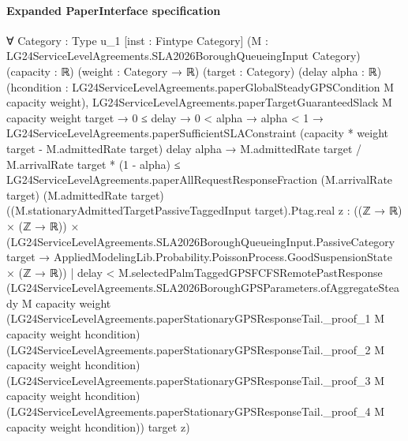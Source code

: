 \documentclass[10pt]{article}
\begin{document}
\paragraph{Expanded PaperInterface specification}
\begin{ReviewVerbatim}
∀ {Category : Type u_1} [inst : Fintype Category] (M : LG24ServiceLevelAgreements.SLA2026BoroughQueueingInput Category)
  (capacity : ℝ) (weight : Category → ℝ) (target : Category) (delay alpha : ℝ)
  (hcondition : LG24ServiceLevelAgreements.paperGlobalSteadyGPSCondition M capacity weight),
  LG24ServiceLevelAgreements.paperTargetGuaranteedSlack M capacity weight target →
    0 ≤ delay →
      0 < alpha →
        alpha < 1 →
          LG24ServiceLevelAgreements.paperSufficientSLAConstraint (capacity * weight target - M.admittedRate target)
              delay alpha →
            M.admittedRate target / M.arrivalRate target * (1 - alpha) ≤
              LG24ServiceLevelAgreements.paperAllRequestResponseFraction (M.arrivalRate target) (M.admittedRate target)
                ((M.stationaryAdmittedTargetPassiveTaggedInput target).Ptag.real
                  {z :
                    ((ℤ → ℝ) × (ℤ → ℝ)) ×
                      (LG24ServiceLevelAgreements.SLA2026BoroughQueueingInput.PassiveCategory target →
                        AppliedModelingLib.Probability.PoissonProcess.GoodSuspensionState × (ℤ → ℝ)) |
                    delay <
                      M.selectedPalmTaggedGPSFCFSRemotePastResponse
                        (LG24ServiceLevelAgreements.SLA2026BoroughGPSParameters.ofAggregateSteady M capacity weight
                          (LG24ServiceLevelAgreements.paperStationaryGPSResponseTail._proof_1 M capacity weight
                            hcondition)
                          (LG24ServiceLevelAgreements.paperStationaryGPSResponseTail._proof_2 M capacity weight
                            hcondition)
                          (LG24ServiceLevelAgreements.paperStationaryGPSResponseTail._proof_3 M capacity weight
                            hcondition)
                          (LG24ServiceLevelAgreements.paperStationaryGPSResponseTail._proof_4 M capacity weight
                            hcondition))
                        target z})
\end{ReviewVerbatim}
\end{document}
